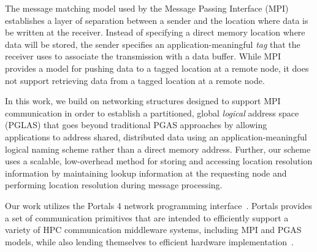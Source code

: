 The message matching model used by the Message Passing Interface
(MPI)~\cite{mpi-forum:15} establishes a layer of separation between a
sender and the location where data is be written at the receiver.
Instead of specifying a direct memory location where data will be
stored, the sender specifies an application-meaningful {\em tag} that
the receiver uses to associate the transmission with a data buffer.
While MPI provides a model for pushing data to a tagged location at a
remote node, it does not support retrieving data from a tagged
location at a remote node.


In this work, we build on networking structures designed to support
MPI communication in order to establish a partitioned, global {\em
  logical} address space (PGLAS) that goes beyond traditional PGAS
approaches by allowing applications to address shared, distributed
data using an application-meaningful logical naming scheme rather than
a direct memory address.  Further, our scheme uses a scalable,
low-overhead method for storing and accessing location resolution
information by maintaining lookup information at the requesting node
and performing location resolution during message processing.

Our work utilizes the Portals 4 network programming
interface~\cite{portals4}.  Portals provides a set of communication
primitives that are intended to efficiently support a variety of HPC
communication middleware systems, including MPI and PGAS models, while
also lending themselves to efficient hardware
implementation~\cite{brightwell:micro:06,bxi}.


